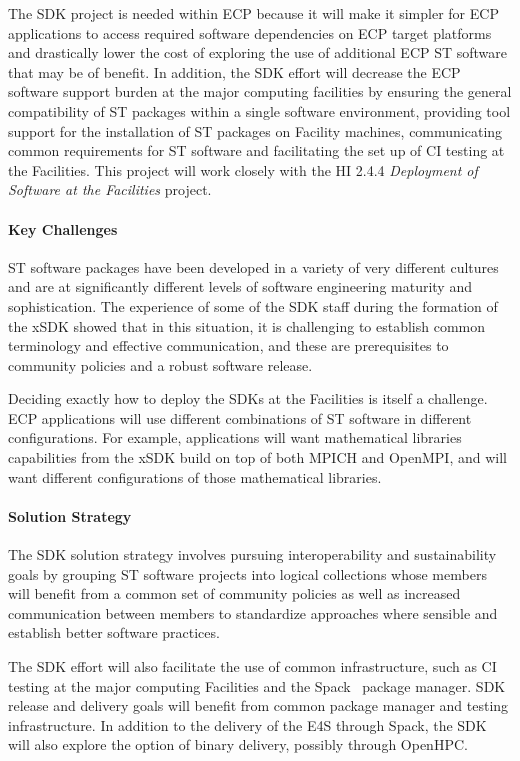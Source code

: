 The SDK project is needed within ECP because it will make it simpler for ECP applications to access required software dependencies on ECP target platforms and drastically lower the cost of exploring the use of additional ECP ST software that may be of benefit. In addition, the SDK effort will decrease the ECP software support burden at the major computing facilities by ensuring the general compatibility of ST packages within a single software environment, providing tool support for the installation of ST packages on Facility machines, communicating common requirements for ST software and facilitating the set up of CI testing at the Facilities. This project will work closely with the HI 2.4.4 \textit{Deployment of Software at the Facilities} project.

\paragraph{Key  Challenges}
ST software packages have been developed in a variety of very different cultures and are at significantly different levels of software engineering maturity and sophistication. The experience of some of the SDK staff during the formation of the xSDK showed that in this situation, it is challenging to establish common terminology and effective communication, and these are prerequisites to community policies and a robust software release.

Deciding exactly how to deploy the SDKs at the Facilities is itself a challenge. ECP applications will use different combinations of ST software in different configurations. For example, applications will want mathematical libraries capabilities from the xSDK build on top of both MPICH and OpenMPI, and will want different configurations of those mathematical libraries.

\paragraph{Solution Strategy}
The SDK solution strategy involves pursuing interoperability and sustainability goals by grouping ST software projects into logical collections whose members will benefit from a common set of community policies as well as increased communication between members to standardize approaches where sensible and establish better software practices. 

The SDK effort will also facilitate the use of common infrastructure, such as CI testing at the major computing Facilities and the Spack~\cite{gamblin+:sc15} package manager. SDK release and delivery goals will benefit from common package manager and testing infrastructure. In addition to the delivery of the E4S through Spack, the SDK will also explore the option of binary delivery, possibly through OpenHPC.

